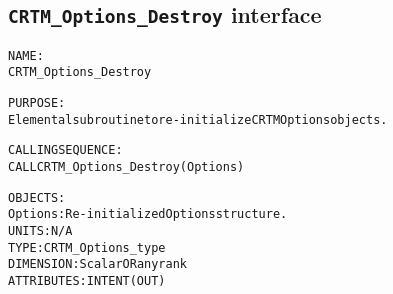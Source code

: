\subsection{\texttt{CRTM\_Options\_Destroy} interface}
  \label{sec:CRTM_Options_Destroy_interface}
  \begin{alltt}
 
  NAME:
        CRTM_Options_Destroy
  
  PURPOSE:
        Elemental subroutine to re-initialize CRTM Options objects.
 
  CALLING SEQUENCE:
        CALL CRTM_Options_Destroy( Options )
 
  OBJECTS:
        Options:      Re-initialized Options structure.
                      UNITS:      N/A
                      TYPE:       CRTM_Options_type
                      DIMENSION:  Scalar OR any rank
                      ATTRIBUTES: INTENT(OUT)
 
  \end{alltt}
